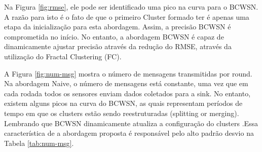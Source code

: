 \documentclass{acm_proc_article-sp}
\begin{document}
Na Figura \ref{fig:rmse}, ele pode ser identificado uma pico na curva para o
BCWSN. A razão para isto é o fato de que o primeiro Cluster formado ter
é apenas uma etapa da inicialização para esta abordagem. Assim, a precisão 
BCWSN é comprometida no início. No entanto, a abordagem BCWSN é capaz de 
dinamicamente ajustar precisão através da redução do RMSE, através da 
utilização do Fractal Clustering (FC).
\vspace*{-.3cm}

A Figura \ref{fig:num-msg} mostra o número de mensagens transmitidas por round.
Na abordagem Naive, o número de mensagens está constante, uma vez que
em cada rodada todos os sensores enviam dados coletados para a sink. 
No entanto, existem alguns picos na curva do BCWSN, as quais representam
períodos de tempo em que os clusters estão sendo reestruturadas 
(splitting or merging). {Lembrando que BCWSN dinamicamente atualiza a
configuração do clusters .}Essa característica de a abordagem proposta
é responsável pelo alto padrão desvio na Tabela \ref{tab:num-msg}.
\vspace*{-.3cm}
\end{document}
